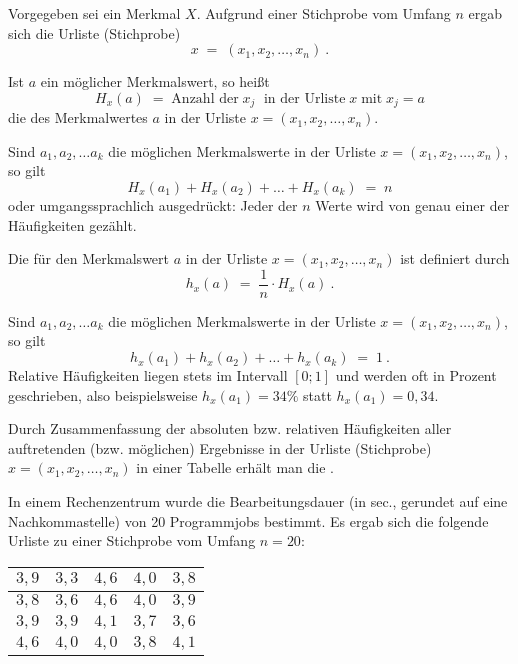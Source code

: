 
\begin{MIntro}
Vorgegeben sei ein Merkmal $X$. Aufgrund einer Stichprobe vom Umfang $n$ ergab sich die Urliste (Stichprobe)
$$
x \;=\; (x_{1},x_{2},\ldots ,x_{n})\: .
$$

\begin{MInfo}
Ist $a$ ein möglicher Merkmalswert, so heißt
$$
H_{x}(a)\; =\; \text{Anzahl der}\;x_{j}\;\text{ in der Urliste}\;x\;\text{mit}\;x_{j}=a
$$
die  des Merkmalwertes $a$ in der Urliste $x=(x_{1},x_{2},\ldots ,x_{n})$.
\end{MInfo}

Sind $a_{1}, a_{2},\ldots a_{k}$ die möglichen Merkmalswerte in der Urliste $x=(x_{1},x_{2},\ldots ,x_{n})$, so gilt
$$
H_{x}(a_{1})+H_{x}(a_{2})+\ldots + H_{x}(a_{k})\; =\; n
$$
oder umgangssprachlich ausgedrückt: Jeder der $n$ Werte wird von genau einer der Häufigkeiten gezählt.

\begin{MInfo}
Die  für den Merkmalswert $a$ in der Urliste $x=(x_{1},x_{2},\ldots ,x_{n})$ ist definiert durch
$$
h_{x}(a)\; =\;\frac{1}{n}\cdot H_{x}(a)\: .
$$
\end{MInfo}

Sind $a_{1}, a_{2},\ldots a_{k}$ die möglichen Merkmalswerte in der Urliste $x=(x_{1},x_{2},\ldots ,x_{n})$, so gilt
$$
h_{x}(a_{1})+h_{x}(a_{2})+\ldots + h_{x}(a_{k})\; =\;1\: .
$$
Relative Häufigkeiten liegen stets im Intervall $[0;1]$ und werden oft in Prozent geschrieben, also beispielsweise $h_x(a_1)=34\%$ statt $h_x(a_1)=0,34$.

\begin{MInfo}
Durch Zusammenfassung der absoluten bzw. relativen Häufigkeiten aller auftretenden (bzw. möglichen) Ergebnisse in der
Urliste (Stichprobe) $x=(x_{1},x_{2},\ldots ,x_{n})$ in einer Tabelle erhält man die .
\end{MInfo}

\begin{MExample}
In einem Rechenzentrum wurde die Bearbeitungsdauer (in sec., gerundet auf eine Nachkommastelle) von 20 Programmjobs bestimmt.
Es ergab sich die folgende Urliste zu einer Stichprobe vom Umfang $n=20$:
\begin{center}
\begin{tabular}{|l|l|l|l|l|}
\hline
$3,9$ & $3,3$ & $4,6$ & $4,0$ & $3,8$ \\ \hline
$3,8$ & $3,6$ & $4,6$ & $4,0$ & $3,9$ \\ \hline
$3,9$ & $3,9$ & $4,1$ & $3,7$ & $3,6$ \\ \hline
$4,6$ & $4,0$ & $4,0$ & $3,8$ & $4,1$ \\ \hline
\end{tabular}
\end{center}


\end{MExample}
\end{MIntro}

